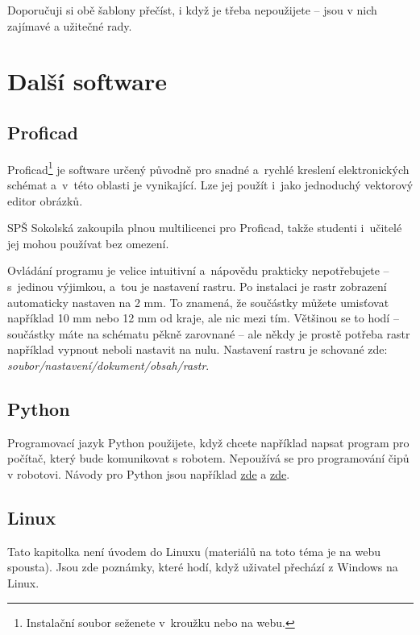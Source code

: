 Doporučuji si obě šablony přečíst, i když je třeba nepoužijete -- jsou v nich zajímavé a užitečné rady.


 
\section{Další software}



\subsection{Proficad}

Proficad\footnote{Instalační soubor seženete v~kroužku nebo na webu.} 
je software určený původně pro snadné a~rychlé kreslení elektronických schémat a~v~této oblasti je vynikající. 
Lze jej použít i~jako jednoduchý vektorový editor obrázků. 

SPŠ Sokolská zakoupila plnou multilicenci pro Proficad, takže studenti i~učitelé jej mohou používat bez omezení. 

Ovládání programu je velice intuitivní a~nápovědu prakticky nepotřebujete -- s~jedinou výjimkou, a~tou je nastavení rastru. 
Po instalaci je rastr zobrazení automaticky nastaven na 2 mm. To znamená, že součástky 
můžete umisťovat například 10 mm nebo 12 mm od kraje, ale nic mezi tím. 
Většinou se to hodí -- součástky máte na schématu pěkně zarovnané -- ale 
někdy je prostě potřeba rastr například vypnout neboli nastavit na nulu. 
Nastavení rastru je schované zde:  {\it soubor/nastavení/dokument/obsah/rastr}.

\subsection{Python}

Programovací jazyk Python použijete, když chcete například napsat program pro počítač, který bude komunikovat s robotem. 
Nepoužívá se pro programování čipů v robotovi. 
Návody pro Python jsou například \href{https://www.sallyx.org/sally/python/}{zde} a  \href{http://diveintopython3.py.cz/index.html}{zde}. 


\subsection{Linux} 

Tato kapitolka není úvodem do Linuxu (materiálů na toto téma je na webu spousta).  Jsou zde poznámky, které hodí, když uživatel přechází z Windows na Linux. 

